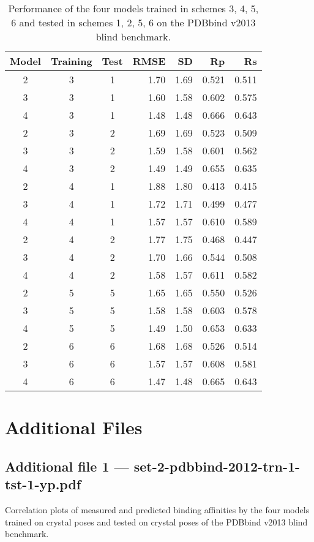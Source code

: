 \documentclass[twocolumn]{bmcart}
\begin{document}
\begin{backmatter}
\begin{table}[ht]
\caption{Performance of the four models trained in schemes 3, 4, 5, 6 and tested in schemes 1, 2, 5, 6 on the PDBbind v2013 blind benchmark.}
\label{rescoring2:set-2-pdbbind-2012-trn-3456-tst-1256-raw}
\begin{tabular}{cccrrrr}
\hline
Model & Training & Test & RMSE & SD & Rp & Rs\\
\hline
2 & 3 & 1 & 1.70 & 1.69 & 0.521 & 0.511\\
3 & 3 & 1 & 1.60 & 1.58 & 0.602 & 0.575\\
4 & 3 & 1 & 1.48 & 1.48 & 0.666 & 0.643\\
\hline
2 & 3 & 2 & 1.69 & 1.69 & 0.523 & 0.509\\
3 & 3 & 2 & 1.59 & 1.58 & 0.601 & 0.562\\
4 & 3 & 2 & 1.49 & 1.49 & 0.655 & 0.635\\
\hline
2 & 4 & 1 & 1.88 & 1.80 & 0.413 & 0.415\\
3 & 4 & 1 & 1.72 & 1.71 & 0.499 & 0.477\\
4 & 4 & 1 & 1.57 & 1.57 & 0.610 & 0.589\\
\hline
2 & 4 & 2 & 1.77 & 1.75 & 0.468 & 0.447\\
3 & 4 & 2 & 1.70 & 1.66 & 0.544 & 0.508\\
4 & 4 & 2 & 1.58 & 1.57 & 0.611 & 0.582\\
\hline
2 & 5 & 5 & 1.65 & 1.65 & 0.550 & 0.526\\
3 & 5 & 5 & 1.58 & 1.58 & 0.603 & 0.578\\
4 & 5 & 5 & 1.49 & 1.50 & 0.653 & 0.633\\
\hline
2 & 6 & 6 & 1.68 & 1.68 & 0.526 & 0.514\\
3 & 6 & 6 & 1.57 & 1.57 & 0.608 & 0.581\\
4 & 6 & 6 & 1.47 & 1.48 & 0.665 & 0.643\\
\hline
\end{tabular}
\end{table}


\section*{Additional Files}

\subsection*{Additional file 1 --- set-2-pdbbind-2012-trn-1-tst-1-yp.pdf}
Correlation plots of measured and predicted binding affinities by the four models trained on crystal poses and tested on crystal poses of the PDBbind v2013 blind benchmark.


\end{backmatter}
\end{document}
